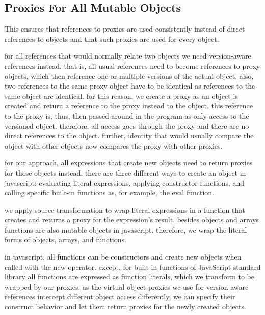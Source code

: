 \subsection{Proxies For All Mutable Objects}

This ensures that references to proxies are used consistently instead of direct references to objects and that such proxies are used for every object.

for all references that would normally relate two objects we need version-aware references instead.
that is, all usual references need to become references to proxy objects, which then reference one or multiple versions of the actual object.
also, two references to the same proxy object have to be identical as references to the same object are identical.
for this reason, we create a proxy as an object is created and return a reference to the proxy instead to the object.
this reference to the proxy is, thus, then passed around in the program as only access to the versioned object.
therefore, all access goes through the proxy and there are no direct references to the object.
further, identity that would usually compare the object with other objects now compares the proxy with other proxies.

for our approach, all expressions that create new objects need to return proxies for those objects instead.
there are three different ways to create an object in javascript: evaluating literal expressions, applying constructor functions, and calling specific built-in functions as, for example, the eval function.

we apply source transformation to wrap literal expressions in a function that creates and returns a proxy for the expression's result.
besides objects and arrays functions are also mutable objects in javascript.
therefore, we wrap the literal forms of objects, arrays, and functions.

in javascript, all functions can be constructors and create new objects when called with the new operator.
except, for built-in functions of JavaScript standard library all functions are expressed as function literals, which we transform to be wrapped by our proxies.
as the virtual object proxies we use for version-aware references intercept different object access differently, we can specify their construct behavior and let them return proxies for the newly created objects.


